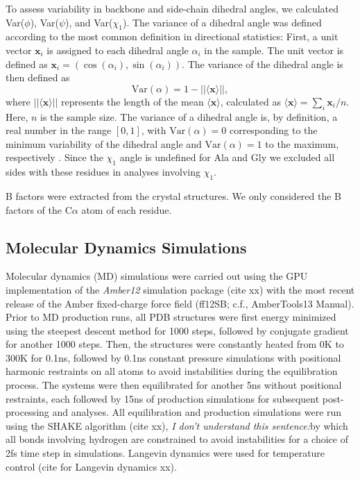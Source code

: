 \documentclass[12pt]{article}
\begin{document}
To assess variability in backbone and side-chain dihedral angles, we calculated Var($\phi$), Var($\psi$), and Var($\chi_1$). The variance of a dihedral angle was defined according to the most common definition in directional statistics:  
First, a unit vector $\mathbf{x}_i$ is assigned to each dihedral angle $\alpha_i$ in the sample. The unit vector is defined as $\mathbf{x}_i = ( \cos (\alpha_i), \sin (\alpha_i) )$.
The variance of the dihedral angle is then defined as
\begin{equation}
\text{Var}(\alpha) = 1 - ||\langle \mathbf{x}\rangle||,
\end{equation}
where $||\langle \mathbf{x}\rangle||$ represents the length of the mean $\langle \mathbf{x}\rangle$, calculated as $\langle \mathbf{x}\rangle=\sum_i \mathbf{x}_i/n$. Here, $n$ is the sample size. The variance of a dihedral angle is, by definition, a real number in the range $[0,1]$, with $\text{Var}(\alpha) = 0$ corresponding to the minimum variability of the dihedral angle and $\text{Var}(\alpha) = 1$ to the maximum, respectively \citep{Berens2009}. Since the $\chi_1$ angle is undefined for Ala and Gly we excluded all sides with these residues in analyses involving $\chi_1$.

B factors were extracted from the crystal structures. We only considered the B factors of the C$\alpha$ atom of each residue.


\subsection*{Molecular Dynamics Simulations}

Molecular dynamics (MD) simulations were carried out using the GPU implementation of the {\it Amber12} simulation package {\color{red}(cite xx)} with the most recent release of the Amber fixed-charge force field (ff12SB; c.f., AmberTools13 Manual). Prior to MD production runs, all PDB structures were first energy minimized using the steepest descent method for 1000 steps, followed by conjugate gradient for another 1000 steps. Then, the structures were constantly heated from 0K to 300K for 0.1ns, followed by 0.1ns constant pressure simulations with positional harmonic restraints on all atoms to avoid instabilities during the equilibration process. The systems were then equilibrated for another 5ns without positional restraints, each followed by 15ns of production simulations for subsequent post-processing and analyses. All equilibration and production simulations were run using the SHAKE algorithm {\color{red}(cite xx)}, {\color{red}\emph{I don't understand this sentence:}by which all bonds involving hydrogen are constrained to avoid instabilities for a choice of 2fs time step in simulations.} Langevin dynamics were used for temperature control {\color{red}(cite for Langevin dynamics xx)}.
\end{document}
